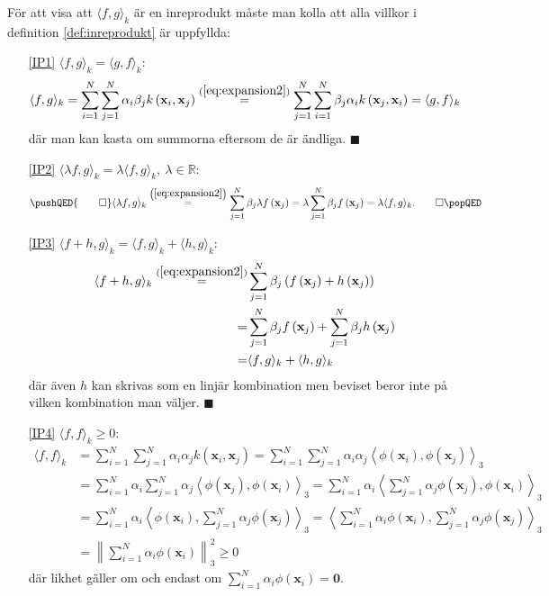 \documentclass[a4paper, 12pt]{report}
\theoremstyle{definition}
\theoremstyle{remark}
\renewcommand\qedsymbol{$\blacksquare$}
\newcommand{\bfx}{\mathbf{x}}
\begin{document}
För att visa att $\langle f, g \rangle_k$ är en inreprodukt måste man kolla att alla villkor i definition \ref{def:inreprodukt} är uppfyllda:
\begin{enumerate}
	\item[\ref{IP1}] $\langle f, g \rangle_k=\langle g, f \rangle_k$:
	\begin{align*}
		\langle f, g \rangle_k = \sum_{i=1}^{N} \sum_{j=1}^{N} \alpha_i \beta_j k\left(\bfx_i, \bfx_j\right) \overset{(\ref{eq:expansion2})}{=} \sum_{j=1}^{N} \sum_{i=1}^{N}  \beta_j \alpha_i k\left(\bfx_j, \bfx_i\right) = \langle g, f \rangle_k
	\end{align*}
	där man kan kasta om summorna eftersom de är ändliga. \hfill \qedsymbol
	\item[\ref{IP2}] $\langle \lambda f, g \rangle_k=\lambda\langle f, g \rangle_k,~\lambda\in\mathbb{R}$:
	\begin{equation*}
	\pushQED{\qed}
		\langle \lambda f, g \rangle_k	\overset{\left(\ref{eq:expansion2}\right)}{=} \sum_{j=1}^{N} \beta_j \lambda f\left(\bfx_j\right) = \lambda \sum_{j=1}^{N} \beta_j f\left(\bfx_j\right) = \lambda\langle f, g \rangle_k. \qedhere
		\popQED
	\end{equation*}
	\item[\ref{IP3}] $\langle f+h, g\rangle_k = \langle f, g\rangle_k + \langle h, g\rangle_k$:
	\begin{align*}
		\langle f+h, g \rangle_k \overset{(\ref{eq:expansion2})}{=} &\sum_{j=1}^{N} \beta_j \left(f\left(\bfx_j\right) + h\left(\bfx_j\right)\right)\\
		= &\sum_{j=1}^{N} \beta_j f\left(\bfx_j\right) + \sum_{j=1}^{N} \beta_j h\left(\bfx_j\right)\\
		= &\langle f, g\rangle_k + \langle h, g\rangle_k
	\end{align*}
	där även $h$ kan skrivas som en linjär kombination men beviset beror inte på vilken kombination man väljer. \hfill \qedsymbol
	\item[\ref{IP4}] $\langle f, f \rangle_k\geq0$:
	\begin{align*}
	\langle f, f \rangle_k &= \sum_{i=1}^{N}\sum_{j=1}^{N}\alpha_i\alpha_jk\left(\bfx_i, \bfx_j\right)
	= \sum_{i=1}^{N}\sum_{j=1}^{N}\alpha_i\alpha_j\left\langle\phi\left(\bfx_i\right),\phi\left(\bfx_j\right)\right\rangle_3\\
	&= \sum_{i=1}^{N}\alpha_i\sum_{j=1}^{N}\alpha_j\left\langle\phi\left(\bfx_j\right),\phi\left(\bfx_i\right)\right\rangle_3
	= \sum_{i=1}^{N}\alpha_i\left\langle\sum_{j=1}^{N}\alpha_j\phi\left(\bfx_j\right),\phi\left(\bfx_i\right)\right\rangle_3\\
	&= \sum_{i=1}^{N}\alpha_i\left\langle\phi\left(\bfx_i\right),\sum_{j=1}^{N}\alpha_j\phi\left(\bfx_j\right)\right\rangle_3
	= \left\langle\sum_{i=1}^{N}\alpha_i\phi\left(\bfx_i\right),\sum_{j=1}^{N}\alpha_j\phi\left(\bfx_j\right)\right\rangle_3\\
	&= \left\|\sum_{i=1}^{N}\alpha_i\phi\left(\bfx_i\right)\right\|_3^2\geq 0
	\end{align*}
	där likhet gäller om och endast om $\sum_{i=1}^{N}\alpha_i\phi\left(\bfx_i\right)=\mathbf{0}$.
	

\end{enumerate}
\end{document}
